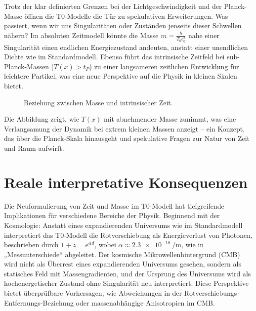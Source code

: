 \documentclass[a4paper,12pt]{article}
\newcommand{\Tfield}{T(x)}
\begin{document}
	Trotz der klar definierten Grenzen bei der Lichtgeschwindigkeit und der Planck-Masse öffnen die T0-Modelle die Tür zu spekulativen Erweiterungen. Was passiert, wenn wir uns Singularitäten oder Zuständen jenseits dieser Schwellen nähern? Im absoluten Zeitmodell könnte die Masse \(m = \frac{\hbar}{T_0 c_0^2}\) nahe einer Singularität einen endlichen Energiezustand andeuten, anstatt einer unendlichen Dichte wie im Standardmodell. Ebenso führt das intrinsische Zeitfeld bei sub-Planck-Massen (\(\Tfield > t_P\)) zu einer langsameren zeitlichen Entwicklung für leichtere Partikel, was eine neue Perspektive auf die Physik in kleinen Skalen bietet.
	
	\begin{figure}[h]
		\centering
		\caption{Beziehung zwischen Masse und intrinsischer Zeit.}
		\label{fig:mass_time}
	\end{figure}
	
	Die Abbildung zeigt, wie \(\Tfield\) mit abnehmender Masse zunimmt, was eine Verlangsamung der Dynamik bei extrem kleinen Massen anzeigt – ein Konzept, das über die Planck-Skala hinausgeht und spekulative Fragen zur Natur von Zeit und Raum aufwirft.
	
	\section{Reale interpretative Konsequenzen}
	
	Die Neuformulierung von Zeit und Masse im T0-Modell hat tiefgreifende Implikationen für verschiedene Bereiche der Physik. Beginnend mit der Kosmologie: Anstatt eines expandierenden Universums wie im Standardmodell interpretiert das T0-Modell die Rotverschiebung als Energieverlust von Photonen, beschrieben durch \(1 + z = e^{\alpha d}\), wobei \(\alpha \approx \SI{2.3e-18}{\per\meter}\), wie in „Messunterschiede“ \cite{pascher_messdifferenzen_2025} abgeleitet. Der kosmische Mikrowellenhintergrund (CMB) wird nicht als Überrest eines expandierenden Universums gesehen, sondern als statisches Feld mit Massengradienten, und der Ursprung des Universums wird als hochenergetischer Zustand ohne Singularität neu interpretiert. Diese Perspektive bietet überprüfbare Vorhersagen, wie Abweichungen in der Rotverschiebungs-Entfernungs-Beziehung oder massenabhängige Anisotropien im CMB.
	
\end{document}
